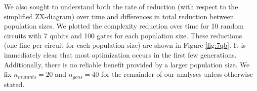 We also sought to understand both the rate of reduction (with respect to the simplified ZX-diagram) over time and differences in total reduction between population sizes.
We plotted the complexity reduction over time for 10 random circuits with 7 qubits and 100 gates for each population size.
These reductions (one line per circuit for each population size) are shown in Figure \ref{fig:7qb}.
It is immediately clear that most optimization occurs in the first few generations.
Additionally, there is no reliable benefit provided by a larger population size.
We fix $n_{mutants} = 20$ and $n_{gens} = 40$ for the remainder of our analyses unless otherwise stated.


